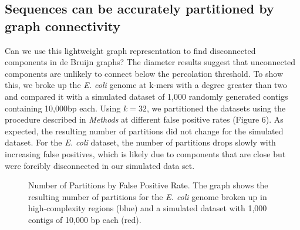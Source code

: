 \documentclass[12pt]{article} \usepackage{simplemargins}
\begin{document}
\subsection{Sequences can be accurately partitioned by graph connectivity}

Can we use this lightweight graph representation to find disconnected
components in de Bruijn graphs?
The diameter results suggest that unconnected
components are unlikely to connect below the percolation threshold. To
show this, we broke up the \emph{E. coli} genome at k-mers with a
degree greater than two and compared it with a simulated dataset of
1,000 randomly generated contigs containing 10,000bp each. Using
$k=32$, we partitioned the datasets using the procedure described in
\emph{Methods} at different false positive rates (Figure 6). As
expected, the resulting number of partitions did not change for the
simulated dataset. For the \emph{E. coli} dataset, the number of
partitions drops slowly with increasing false positives, which is
likely due to components that are close but were forcibly disconnected
in our simulated data set.

\begin{figure}
\caption{Number of Partitions by False Positive Rate. The 
graph shows the resulting number of partitions for the 
\emph{E. coli} genome broken up in high-complexity regions (blue) and 
a simulated dataset with 1,000 contigs of 10,000 bp each (red).}
\end{figure}
\end{document}
